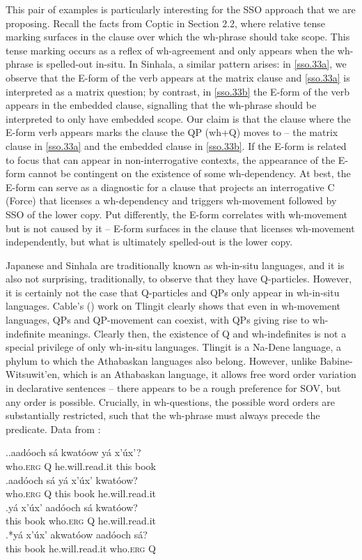 \documentclass[charis]{glossa}
\begin{document}
This pair of examples is particularly interesting for the SSO approach that we are proposing. Recall the facts from Coptic in Section 2.2, where relative tense marking surfaces in the clause over which the wh-phrase should take scope. This tense marking occurs as a reflex of wh-agreement and only appears when the wh-phrase is spelled-out in-situ. In Sinhala, a similar pattern arises: in \ref{sso.33a}, we observe that the E-form of the verb appears at the matrix clause and \ref{sso.33a} is interpreted as a matrix question; by contrast, in \ref{sso.33b} the E-form of the verb appears in the embedded clause, signalling that the wh-phrase should be interpreted to only have embedded scope. Our claim is that the clause where the E-form verb appears marks the clause the QP (wh+Q) moves to -- the matrix clause in \ref{sso.33a} and the embedded clause in \ref{sso.33b}. If the E-form is related to focus that can appear in non-interrogative contexts, the appearance of the E-form cannot be contingent on the existence of some wh-dependency. At best, the E-form can serve as a diagnostic for a clause that projects an interrogative C (Force) that licenses a wh-dependency and triggers wh-movement followed by SSO of the lower copy. Put differently, the E-form correlates with wh-movement but is not caused by it -- E-form surfaces in the clause that licenses wh-movement independently, but what is ultimately spelled-out is the lower copy.

Japanese and Sinhala are traditionally known as wh-in-situ languages, and it is also not surprising, traditionally, to observe that they have Q-particles. However, it is certainly not the case that Q-particles and QPs only appear in wh-in-situ languages. Cable's (\citeyear{cable:2007}) work on Tlingit clearly shows that even in wh-movement languages, QPs and QP-movement can coexist, with QPs giving rise to wh-indefinite meanings. Clearly then, the existence of Q and wh-indefinites is not a special privilege of only wh-in-situ languages. Tlingit is a Na-Dene language, a phylum to which the Athabaskan languages also belong. However, unlike Babine-Witsuwit'en, which is an Athabaskan language, it allows free word order variation in declarative sentences -- there appears to be a rough preference for SOV, but any order is possible. Crucially, in wh-questions, the possible word orders are substantially restricted, such that the wh-phrase must always precede the predicate. Data from \cite[63--66]{cable:2007}:

\ex.\ag.aad\'ooch s\'a kwat\'oow y\'a x'\'ux'?\\
   who.\textsc{erg} Q he.will.read.it this book\\
   \bg.aad\'ooch s\'a y\'a x'\'ux' kwat\'oow?\\
   who.\textsc{erg} Q this book he.will.read.it\\
   \bg.y\'a x'\'ux' aad\'ooch s\'a kwat\'oow?\\
   this book  who.\textsc{erg} Q he.will.read.it\\
   \bg.*\label{sso.40d}y\'a x'\'ux' akwat\'oow aad\'ooch s\'a?\\
   this book he.will.read.it who.\textsc{erg} Q\\
\end{document}
